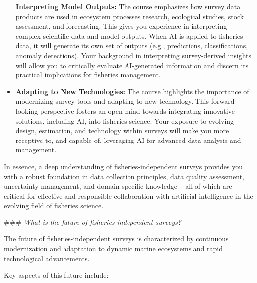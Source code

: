 \documentclass[
  letterpaper,
  oneside,
  open=any]{scrbook}
\begin{document}
\begin{itemize}
  \textbf{Interpreting Model Outputs:} The course emphasizes how survey
  data products are used in ecosystem processes research, ecological
  studies, stock assessment, and forecasting. This gives you experience
  in interpreting complex scientific data and model outputs. When AI is
  applied to fisheries data, it will generate its own set of outputs
  (e.g., predictions, classifications, anomaly detections). Your
  background in interpreting survey-derived insights will allow you to
  critically evaluate AI-generated information and discern its practical
  implications for fisheries management.
\item
  \textbf{Adapting to New Technologies:} The course highlights the
  importance of modernizing survey tools and adapting to new technology.
  This forward-looking perspective fosters an open mind towards
  integrating innovative solutions, including AI, into fisheries
  science. Your exposure to evolving design, estimation, and technology
  within surveys will make you more receptive to, and capable of,
  leveraging AI for advanced data analysis and management.
\end{itemize}

In essence, a deep understanding of fisheries-independent surveys
provides you with a robust foundation in data collection principles,
data quality assessment, uncertainty management, and domain-specific
knowledge -- all of which are critical for effective and responsible
collaboration with artificial intelligence in the evolving field of
fisheries science.

\#\#\# \emph{What is the future of fisheries-independent surveys?}

The future of fisheries-independent surveys is characterized by
continuous modernization and adaptation to dynamic marine ecosystems and
rapid technological advancements.

Key aspects of this future include:
\end{document}
